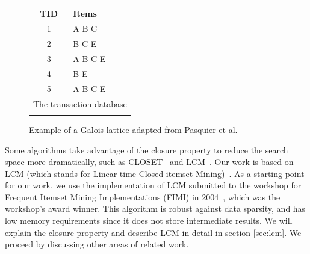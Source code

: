 \documentclass[letterpaper,12pt,titlepage,oneside,final]{book}
\begin{document}
\begin{figure}
\centering
\begin{tabular}{|c|p{1.7cm}|}
\hline
TID&Items\\\hline
1&A B C\\
2&B C E\\ 
3&A B C E\\
4&B E\\
5&A B C E\\
\hline
\multicolumn{2}{c}{The transaction database}\\
\multicolumn{2}{c}{}\\
\end{tabular}
\caption{Example of a Galois lattice adapted from Pasquier et al.~\cite{pasquier1999efficient}}
\label{fig:lattice}
\end{figure}

Some algorithms take advantage of the closure property to 
reduce the search space more dramatically,
such as CLOSET~\cite{pei2000closet}
and LCM~\cite{uno2004lcm}.
Our work is based on LCM (which stands for Linear-time Closed itemset Mining)~\cite{uno2004lcm}.
As a starting point for our work, we use the implementation of LCM submitted
to the workshop for Frequent Itemset Mining Implementations (FIMI) in
2004~\cite{DBLP:conf/fimi/2004}, which was the workshop's award winner. 
This algorithm is robust against data sparsity, 
and has low memory requirements 
since it does not store intermediate results.
We will explain the closure property and describe LCM in detail in  section \ref{sec:lcm}. 
We proceed by discussing other areas of related work.
\end{document}
